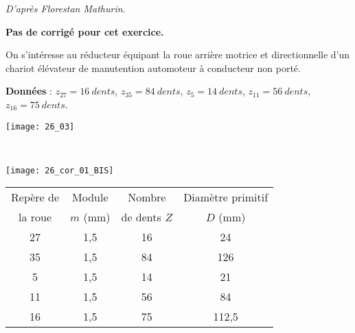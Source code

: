 \normaltrue \difficilefalse \tdifficilefalse
\correctiontrue



\textit{D'après Florestan Mathurin.}

\setcounter{numques}{0}
\ifcorrection
\else
\textbf{Pas de corrigé pour cet exercice.}
\fi

\ifprof
\else
On s’intéresse au réducteur équipant la roue arrière motrice et directionnelle d’un chariot élévateur de manutention automoteur à conducteur non porté. 


\textbf{Données }: $z_{27} = \SI{16}{dents}$, $z_{35} = \SI{84}{dents}$, $z_{5} = \SI{14}{dents}$, $z_{11} = \SI{56}{dents}$, $z_{16} = \SI{75}{dents}$. 

\fi


\ifprof
\else
\begin{center}
\texttt{[image: 26\_03]}
\end{center}
\fi

\ifprof ~\\
\begin{center}
\texttt{[image: 26\_cor\_01\_BIS]}
\end{center}
\else
\fi

\ifprof

\footnotesize
\begin{center}
\begin{tabular}{|c|c|c|c|}
\hline
Repère de  & Module  & Nombre & Diamètre primitif  \\
la roue & $m$ (mm) & de dents $Z$ & $D$ (mm) \\
\hline
\hline
27 & 1,5 &16 & 24\\ \hline
35 & 1,5 &84 & 126\\ \hline
5   &1,5 &14 & 21\\ \hline
11 & 1,5 & 56 & 84 \\ \hline
16 &  1,5&  75& 112,5\\ \hline

\end{tabular}
\end{center}

